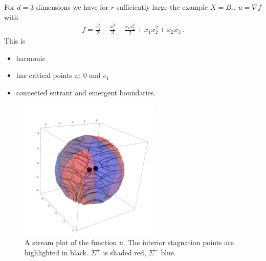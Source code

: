 \begin{frame}
  \begin{example}
    For $d=3$ dimensions we have for $r$ sufficiently large the example $X=B_r$, $u=\nabla f$ with
    \begin{align*}
      f=\frac{x_1^2}{2}-\frac{x_1^3}{3}-\frac{x_1x_2^2}{2}+x_1x_2^2+x_2x_3\,.
    \end{align*}
    This is
    \begin{itemize}
      \item harmonic
      \item has critical points at $0$ and $e_1$
      \item connected entrant and emergent boundaries.
    \end{itemize}
    
  \end{example}
\end{frame}

\begin{frame}
  \begin{figure}
    \centering
    \includegraphics[width=0.6\textwidth]{../plots/n3_hf_inflowOutflow_Ball_overview.pdf}
    \caption{A stream plot of the function $u$. The interior stagnation points are highlighted in black.
    $\Sigma^+$ is shaded red, $\Sigma^-$ blue.}
    \label{pl:n3_hf_inflowOutflowStagnationPoint_overview}
  \end{figure}
\end{frame}

